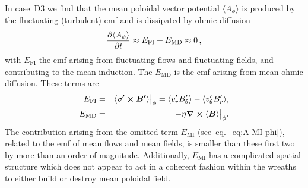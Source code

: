 In case~D3 we find that the mean poloidal vector potential 
$\langle A_\phi \rangle$ is produced by the fluctuating (turbulent) emf and is
dissipated by ohmic diffusion
\begin{equation}
  \label{eq:poloidal balance}
  \frac{\partial \langle A_\phi \rangle}{\partial t} \approx 
  E_\mathrm{FI} +
  E_\mathrm{MD} \approx 0\thinspace,
\end{equation}
with $E_\mathrm{FI}$ the emf arising from fluctuating flows and
fluctuating fields, and contributing to the mean induction.  The
$E_\mathrm{MD}$ is the emf arising from mean
ohmic diffusion.  These terms are
\begin{eqnarray}
  \label{eq:E_FI}
  E_\mathrm{FI} &=& \langle \boldsymbol{v'}\boldsymbol{\times}\boldsymbol{B'} \rangle{\big|}_\phi
  = \langle v_r' B_\theta' \rangle - 
    \langle v_\theta' B_r' \rangle, \\
  E_\mathrm{MD} &=& -\eta \boldsymbol{\nabla} \boldsymbol{\times} \langle \boldsymbol{B} \rangle{\big|}_\phi.
\end{eqnarray}
The contribution arising from the omitted term $E_\mathrm{MI}$ 
(see~eq.~\ref{eq:A MI phi}), related to the emf of mean flows and mean
fields, is smaller than these first two by more than an order
of magnitude.  Additionally, $E_\mathrm{MI}$ has a complicated spatial
structure which does not appear to act in a coherent fashion within
the wreaths to either build or destroy mean poloidal field.

